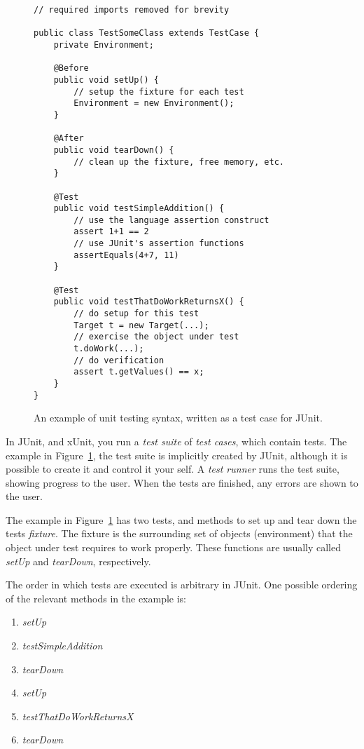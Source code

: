\documentclass[a4paper,11pt]{kth-mag}
\begin{document}
\begin{figure}[h!]
\lstset{language=Java}
\begin{lstlisting}
// required imports removed for brevity

public class TestSomeClass extends TestCase {
	private Environment;

	@Before
	public void setUp() {
		// setup the fixture for each test
		Environment = new Environment();
	}

	@After
	public void tearDown() {
		// clean up the fixture, free memory, etc.
	}

	@Test
	public void testSimpleAddition() {
		// use the language assertion construct
		assert 1+1 == 2
		// use JUnit's assertion functions
		assertEquals(4+7, 11)
	}

	@Test
	public void testThatDoWorkReturnsX() {
		// do setup for this test
		Target t = new Target(...);
		// exercise the object under test
		t.doWork(...);
		// do verification
		assert t.getValues() == x;
	}
}
\end{lstlisting}
\caption{An example of unit testing syntax, written as a test case for JUnit.}
\label{figure-junit}
\end{figure}

In JUnit, and xUnit, you run a \textit{test suite} of \textit{test cases},
which contain tests. The example in Figure~\ref{figure-junit}, the test suite
is implicitly created by JUnit, although it is possible to create it and
control it your self. A \textit{test runner} runs the test suite, showing
progress to the user.  When the tests are finished, any errors are shown to the
user.

The example in Figure~\ref{figure-junit} has two tests, and methods to set up
and tear down the tests \textit{fixture}. The fixture is the surrounding set of
objects (environment) that the object under test requires to work properly.
These functions are usually called \textit{setUp} and \textit{tearDown},
respectively.

The order in which tests are executed is arbitrary in JUnit. One possible
ordering of the relevant methods in the example is:

\begin{enumerate}
	\item \textit{setUp}
	\item \textit{testSimpleAddition}
	\item \textit{tearDown}

	\item \textit{setUp}
	\item \textit{testThatDoWorkReturnsX}
	\item \textit{tearDown}
\end{enumerate}
\end{document}
